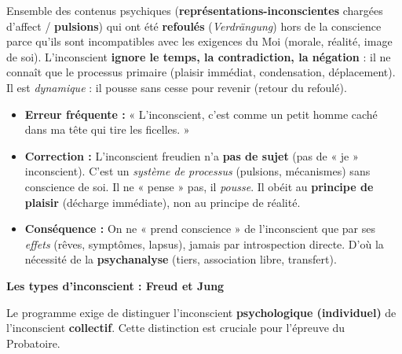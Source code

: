 \documentclass[11pt]{article}
\begin{document}
\begin{definition}
Ensemble des contenus psychiques (\textbf{représentations-inconscientes} chargées d'affect / \textbf{pulsions}) qui ont été \textbf{refoulés} (\emph{Verdrängung}) hors de la conscience parce qu'ils sont incompatibles avec les exigences du Moi (morale, réalité, image de soi). L'inconscient \textbf{ignore le temps, la contradiction, la négation} : il ne connaît que le processus primaire (plaisir immédiat, condensation, déplacement). Il est \emph{dynamique} : il pousse sans cesse pour revenir (retour du refoulé).
\end{definition}

\begin{attention}
\begin{itemize}
    \item \textbf{Erreur fréquente :} « L'inconscient, c'est comme un petit homme caché dans ma tête qui tire les ficelles. »
    \item \textbf{Correction :} L'inconscient freudien n'a \textbf{pas de sujet} (pas de « je » inconscient). C'est un \emph{système de processus} (pulsions, mécanismes) sans conscience de soi. Il ne « pense » pas, il \emph{pousse}. Il obéit au \textbf{principe de plaisir} (décharge immédiate), non au principe de réalité.
    \item \textbf{Conséquence :} On ne « prend conscience » de l'inconscient que par ses \emph{effets} (rêves, symptômes, lapsus), jamais par introspection directe. D'où la nécessité de la \textbf{psychanalyse} (tiers, association libre, transfert).
\end{itemize}
\end{attention}

\textbf{Les types d'inconscient : Freud et Jung}\par

Le programme exige de distinguer l'inconscient \textbf{psychologique (individuel)} de l'inconscient \textbf{collectif}. Cette distinction est cruciale pour l'épreuve du Probatoire.
\end{document}

